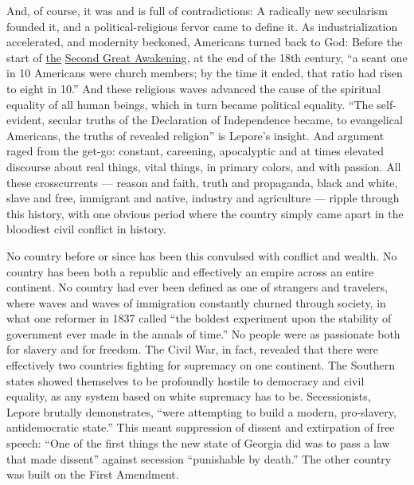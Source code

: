 And, of course, it was and is full of contradictions: A radically new
secularism founded it, and a political-religious fervor came to define
it. As industrialization accelerated, and modernity beckoned, Americans
turned back to God: Before the start of
\href{https://www.u-s-history.com/pages/h1091.html}{the}
\href{https://www.u-s-history.com/pages/h1091.html}{Second Great
Awakening}, at the end of the 18th century, ``a scant one in 10
Americans were church members; by the time it ended, that ratio had
risen to eight in 10.'' And these religious waves advanced the cause of
the spiritual equality of all human beings, which in turn became
political equality. ``The self-evident, secular truths of the
Declaration of Independence became, to evangelical Americans, the truths
of revealed religion'' is Lepore's insight. And argument raged from the
get-go: constant, careening, apocalyptic and at times elevated discourse
about real things, vital things, in primary colors, and with passion.
All these crosscurrents --- reason and faith, truth and propaganda,
black and white, slave and free, immigrant and native, industry and
agriculture --- ripple through this history, with one obvious period
where the country simply came apart in the bloodiest civil conflict in
history.

No country before or since has been this convulsed with conflict and
wealth. No country has been both a republic and effectively an empire
across an entire continent. No country had ever been defined as one of
strangers and travelers, where waves and waves of immigration constantly
churned through society, in what one reformer in 1837 called ``the
boldest experiment upon the stability of government ever made in the
annals of time.'' No people were as passionate both for slavery and for
freedom. The Civil War, in fact, revealed that there were effectively
two countries fighting for supremacy on one continent. The Southern
states showed themselves to be profoundly hostile to democracy and civil
equality, as any system based on white supremacy has to be.
Secessionists, Lepore brutally demonstrates, ``were attempting to build
a modern, pro-slavery, antidemocratic state.'' This meant suppression of
dissent and extirpation of free speech: ``One of the first things the
new state of Georgia did was to pass a law that made dissent'' against
secession ``punishable by death.'' The other country was built on the
First Amendment.

